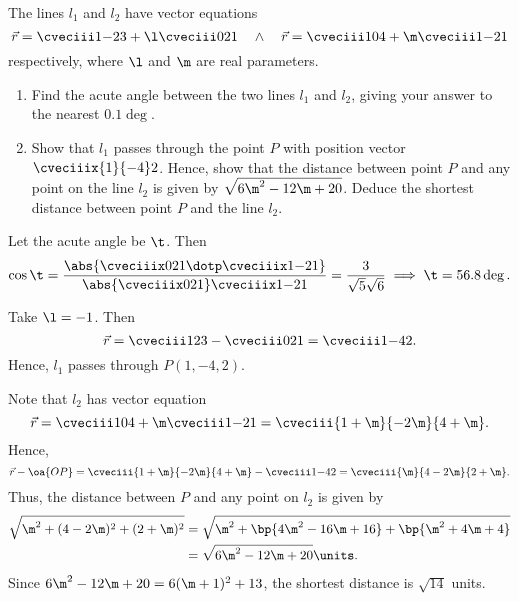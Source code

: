 \begin{problem}
    The lines $l_1$ and $l_2$ have vector equations \[\vec r = \cveciii1{-2}3 + \l \cveciii021 \quad \land \quad \vec r = \cveciii104 + \m \cveciii1{-2}1\] respectively, where $\l$ and $\m$ are real parameters.

    \begin{enumerate}
        \item Find the acute angle between the two lines $l_1$ and $l_2$, giving your answer to the nearest $0.1\deg$.
        \item Show that $l_1$ passes through the point $P$ with position vector $\cveciiix{1}{-4}2$. Hence, show that the distance between point $P$ and any point on the line $l_2$ is given by $\sqrt{6\m^2 - 12\m + 20}$. Deduce the shortest distance between point $P$ and the line $l_2$.
    \end{enumerate}
\end{problem}
\begin{solution}
    \begin{ppart}
        Let the acute angle be $\t$. Then \[\cos \t = \frac{\abs{\cveciiix021 \dotp \cveciiix1{-2}1}}{\abs{\cveciiix021} \cveciiix1{-2}{1}} = \frac{3}{\sqrt5 \sqrt6} \implies \t = 56.8\deg.\]
    \end{ppart}
    \begin{ppart}
        Take $\l = -1$. Then \[\vec r = \cveciii123 - \cveciii021 = \cveciii1{-4}2.\] Hence, $l_1$ passes through $P(1, -4, 2)$.

        Note that $l_2$ has vector equation \[\vec r = \cveciii104 + \m \cveciii1{-2}{1} = \cveciii{1 + \m}{-2\m}{4 + \m}.\] Hence, \[\vec r - \oa{OP} = \cveciii{1 + \m}{-2\m}{4 + \m} - \cveciii1{-4}{2} = \cveciii{\m}{4 -2\m}{2 + \m}.\] Thus, the distance between $P$ and any point on $l_2$ is given by
        \begin{align*}
            \sqrt{\m^2 + (4-2 \m)^2 + (2+\m)^2} &= \sqrt{\m^2 + \bp{4\m^2 - 16\m + 16} + \bp{\m^2 + 4\m + 4}}\\
            &= \sqrt{6\m^2 - 12 \m + 20} \units.
        \end{align*}
        Since $6\m^2 - 12 \m + 20 = 6(\m + 1)^2 + 13$, the shortest distance is $\sqrt{14}$ units.
    \end{ppart}
\end{solution}

